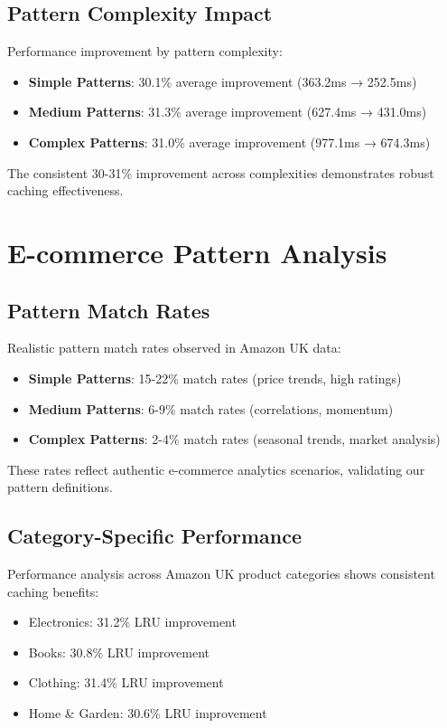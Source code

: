 \documentclass[conference]{IEEEtran}
\begin{document}
\subsection{Pattern Complexity Impact}

Performance improvement by pattern complexity:

\begin{itemize}
\item \textbf{Simple Patterns}: 30.1\% average improvement (363.2ms → 252.5ms)
\item \textbf{Medium Patterns}: 31.3\% average improvement (627.4ms → 431.0ms)
\item \textbf{Complex Patterns}: 31.0\% average improvement (977.1ms → 674.3ms)
\end{itemize}

The consistent 30-31\% improvement across complexities demonstrates robust caching effectiveness.

\section{E-commerce Pattern Analysis}

\subsection{Pattern Match Rates}

Realistic pattern match rates observed in Amazon UK data:

\begin{itemize}
\item \textbf{Simple Patterns}: 15-22\% match rates (price trends, high ratings)
\item \textbf{Medium Patterns}: 6-9\% match rates (correlations, momentum)
\item \textbf{Complex Patterns}: 2-4\% match rates (seasonal trends, market analysis)
\end{itemize}

These rates reflect authentic e-commerce analytics scenarios, validating our pattern definitions.

\subsection{Category-Specific Performance}

Performance analysis across Amazon UK product categories shows consistent caching benefits:

\begin{itemize}
\item Electronics: 31.2\% LRU improvement
\item Books: 30.8\% LRU improvement
\item Clothing: 31.4\% LRU improvement
\item Home \& Garden: 30.6\% LRU improvement
\end{itemize}
\end{document}
